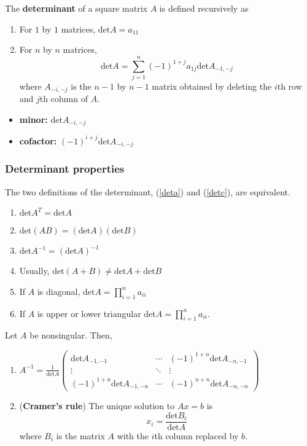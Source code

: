 \documentclass[compress]{beamer}
\renewcommand{\det}{\mathrm{det}}
\theoremstyle{definition}
\begin{document}
\begin{frame}
  \begin{definition}\label{detc}
    The \textbf{determinant} of a square matrix $A$ is defined
    recursively as
    \begin{enumerate}
    \item For $1$ by $1$ matrices, $\det A = a_{11}$
    \item For $n$ by $n$ matrices, 
      \[ \det A = \sum_{j=1}^n (-1)^{1+j} a_{1j} \det A_{-1,-j} \]
      where $A_{-i,-j}$ is the $n-1$ by $n-1$ matrix obtained by
      deleting the $i$th row and $j$th column of $A$.
    \end{enumerate}
  \end{definition}
  \begin{itemize}
  \item \textbf{minor:} $\det A_{-i,-j}$ 
  \item \textbf{cofactor:} $(-1)^{i+j} \det A_{-i,-j}$
  \end{itemize}
\end{frame}

\begin{frame}
  \frametitle{Determinant properties}
  \begin{theorem}
    The two definitions of the determinant, (\ref{deta}) and
    (\ref{detc}), are equivalent.
  \end{theorem}
  \begin{enumerate}
  \item $\det A^T = \det A$
  \item $\det (AB) = (\det A) (\det B)$
  \item $\det A^{-1} = (\det A)^{-1}$
  \item Usually, $\det(A + B) \neq \det A + \det B$
  \item If $A$ is diagonal, $\det A = \prod_{i=1}^n a_{ii}$
  \item\label{dpt} If $A$ is upper or lower triangular $\det A = \prod_{i=1}^n
    a_{ii}$.  
  \end{enumerate}
\end{frame}

\begin{frame}
  \begin{theorem}
    Let $A$ be nonsingular. Then,
    \begin{enumerate}
    \item $A^{-1} = \frac{1}{\det A} \begin{pmatrix} 
        \det A_{-1,-1} & \cdots & (-1)^{1+n} \det A_{-n,-1} \\
        \vdots & \ddots & \vdots \\
        (-1)^{1+n} \det A_{-1,-n} & \cdots & (-1)^{n+n} \det A_{-n,-n} 
      \end{pmatrix}$
    \item (\textbf{Cramer's rule}) The unique solution to $A x = b$ is 
      \[ x_i = \frac{\det B_i}{\det A} \]
      where $B_i$ is the matrix $A$ with the $i$th column replaced by
      $b$. 
    \end{enumerate}
  \end{theorem}
\end{frame}
\end{document}
